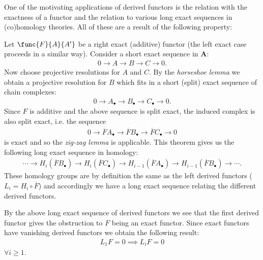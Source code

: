 	One of the motivating applications of derived functors is the relation with the exactness of a functor and the relation to various long exact sequences in (co)homology theories. All of these are a result of the following property:
	\begin{property}
		Let $\func{F}{A}{A'}$ be a right exact (additive) functor (the left exact case proceeds in a similar way). Consider a short exact sequence in $\mathbf{A}$:
		\begin{gather}
			0\longrightarrow A\longrightarrow B\longrightarrow C\longrightarrow 0.
		\end{gather}
		Now choose projective resolutions for $A$ and $C$. By the \textit{horseshoe lemma} we obtain a projective resolution for $B$ which fits in a short (split) exact sequence of chain complexes:
		\begin{gather}
			0\longrightarrow A_\bullet\longrightarrow B_\bullet\longrightarrow C_\bullet\longrightarrow 0.
		\end{gather}
		Since $F$ is additive and the above sequence is split exact, the induced complex is also split exact, i.e. the sequence
		\begin{gather}
			0\longrightarrow\overline{F}A_\bullet\longrightarrow\overline{F}B_\bullet\longrightarrow\overline{F}C_\bullet\longrightarrow0
		\end{gather}
		is exact and so the \textit{zig-zag lemma} is applicable. This theorem gives us the following long exact sequence in homology:
		\begin{gather}
			\cdots\longrightarrow H_i(\overline{F}B_\bullet)\longrightarrow H_i(\overline{F}C_\bullet) \longrightarrow H_{i-1}(\overline{F}A_\bullet) \longrightarrow H_{i-1}(\overline{F}B_\bullet) \longrightarrow\cdots.
		\end{gather}
		These homology groups are by definition the same as the left derived functors ($L_i = H_i\circ\overline{F}$) and accordingly we have a long exact sequence relating the different derived functors.
	\end{property}
	\begin{result}
		By the above long exact sequence of derived functors we see that the first derived functor gives the obstruction to $F$ being an exact functor. Since exact functors have vanishing derived functors we obtain the following result:
		\begin{gather}
			L_1F = 0\implies L_iF=0
		\end{gather}
        $\forall i\geq 1$.
	\end{result}

